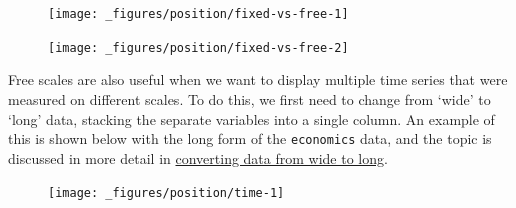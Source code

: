 \begin{figure}[H]
  \centering
  \texttt{[image: \_figures/position/fixed-vs-free-1]}%
\end{figure}

\begin{Shaded}
\begin{Highlighting}[]
\StringTok{ } \NormalTok{)}
\end{Highlighting}
\end{Shaded}

\begin{figure}[H]
  \centering
  \texttt{[image: \_figures/position/fixed-vs-free-2]}
\end{figure}

Free scales are also useful when we want to display multiple time series
that were measured on different scales. To do this, we first need to
change from `wide' to `long' data, stacking the separate variables into
a single column. An example of this is shown below with the long form of
the \texttt{economics} data, and the topic is discussed in more detail
in \protect\hyperlink{sec:spread-gather}{converting data from wide to
long}. 

\begin{Shaded}
\begin{Highlighting}[]
\CommentTok{#> }
\StringTok{ }
\StringTok{  }\NormalTok{() +}\StringTok{ }
\StringTok{  } \NormalTok{, } \NormalTok{)}
\end{Highlighting}
\end{Shaded}

\begin{figure}[H]
  \centering
  \texttt{[image: \_figures/position/time-1]}
\end{figure}


